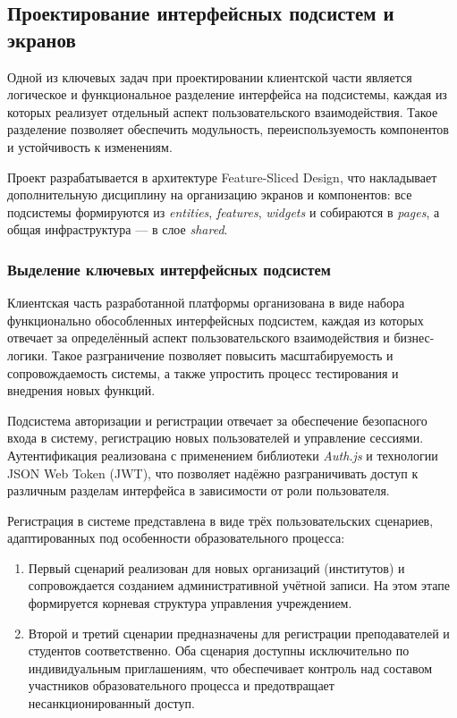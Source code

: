 \subsection{Проектирование интерфейсных подсистем и экранов}

Одной из ключевых задач при проектировании клиентской части является логическое и функциональное разделение интерфейса на подсистемы, каждая из которых реализует отдельный аспект пользовательского взаимодействия. Такое разделение позволяет обеспечить модульность, переиспользуемость компонентов и устойчивость к изменениям.

Проект разрабатывается в архитектуре Feature-Sliced Design, что накладывает дополнительную дисциплину на организацию экранов и компонентов: все подсистемы формируются из \textit{entities}, \textit{features}, \textit{widgets} и собираются в \textit{pages}, а общая инфраструктура — в слое \textit{shared}.

\subsubsection{Выделение ключевых интерфейсных подсистем}

Клиентская часть разработанной платформы организована в виде набора функционально обособленных интерфейсных подсистем, каждая из которых отвечает за определённый аспект пользовательского взаимодействия и бизнес-логики. Такое разграничение позволяет повысить масштабируемость и сопровождаемость системы, а также упростить процесс тестирования и внедрения новых функций.

Подсистема авторизации и регистрации отвечает за обеспечение безопасного входа в систему, регистрацию новых пользователей и управление сессиями. Аутентификация реализована с применением библиотеки \textit{Auth.js} и технологии JSON Web Token (JWT), что позволяет надёжно разграничивать доступ к различным разделам интерфейса в зависимости от роли пользователя.

Регистрация в системе представлена в виде трёх пользовательских сценариев, адаптированных под особенности образовательного процесса:
\begin{enumerate}
\item Первый сценарий реализован для новых организаций (институтов) и сопровождается созданием административной учётной записи. На этом этапе формируется корневая структура управления учреждением.
\item Второй и третий сценарии предназначены для регистрации преподавателей и студентов соответственно. Оба сценария доступны исключительно по индивидуальным приглашениям, что обеспечивает контроль над составом участников образовательного процесса и предотвращает несанкционированный доступ.
\end{enumerate}

